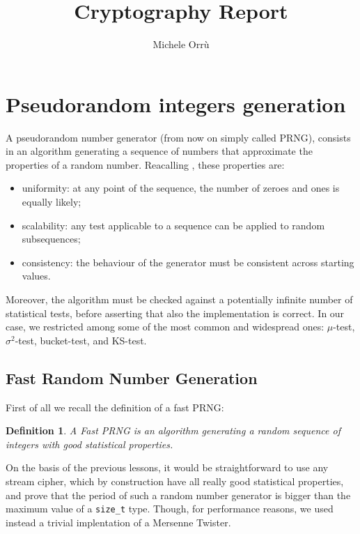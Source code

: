 \documentclass[10pt,a4paper]{report}
\title{Cryptography Report}
\author{Michele Orr\`u}
\newcommand{\code}[1]{\texttt{#1}}
\begin{document}
\maketitle

\section{Pseudorandom integers generation}
A pseudorandom number generator (from now on simply called PRNG), consists in an
algorithm generating a sequence of numbers that approximate the properties of a
random number. Reacalling \cite{stallings}, these properties are:
\begin{itemize}
  \setlength{\itemsep}{1pt}
  \setlength{\parskip}{0pt}
  \setlength{\parsep}{0pt}

\item uniformity: at any point of the sequence, the number of zeroes and ones is
  equally likely;
\item scalability: any test applicable to a sequence can be applied to random
  subsequences;
\item consistency: the behaviour of the generator must be consistent across
  starting values.
\end{itemize}

\noindent
Moreover, the algorithm must be checked against a potentially infinite number of
statistical tests, before asserting that also the implementation is correct. In
our case, we restricted among some of the most common and
widespread ones\cite{beautifultesting}: $\mu$-test, $\sigma^2$-test, bucket-test, and
KS-test.


\subsection{Fast Random Number Generation}

First of all we recall the definition of a fast PRNG:

\newtheorem*{FPRNG}{Definition}
\begin{FPRNG}
  A Fast PRNG is an algorithm generating a random sequence of integers with good
  statistical properties.
\end{FPRNG}

On the basis of the previous lessons, it would be straightforward to use any
stream cipher, which by construction have all really good statistical
properties, and prove that the period of such a random number generator is
bigger than the maximum value of a \code{size\_t} type.
Though, for performance reasons, we used instead a trivial implentation of a Mersenne
Twister.
\end{document}
